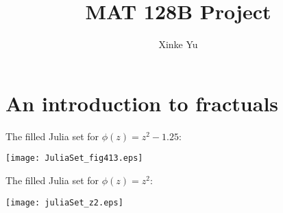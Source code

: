 \documentclass[11pt]{article}
\title{MAT 128B  Project}
\author{Xinke Yu}
\date{}							%
\begin{document}
\maketitle

\section{An introduction to fractuals}
The filled Julia set for $\phi(z)=z^2-1.25$:
\begin{center}
   \texttt{[image: JuliaSet\_fig413.eps]}
\end{center}
The filled Julia set for $\phi(z)=z^2$:
\begin{center}
   \texttt{[image: juliaSet\_z2.eps]}
\end{center}
\end{document}
